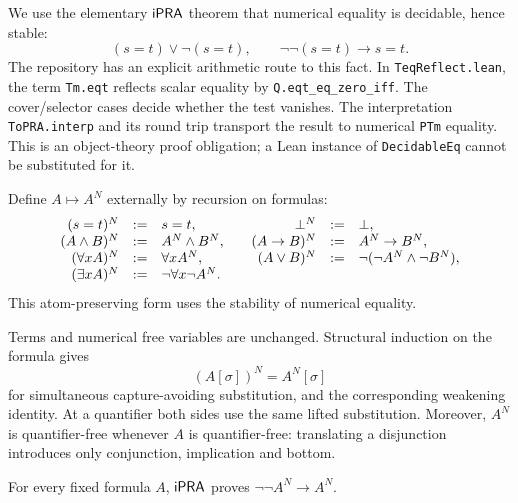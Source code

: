 We use the elementary \(\mathsf{iPRA}\) theorem that numerical equality is
decidable, hence stable:
\[
 (s=t)\lor\neg(s=t),
 \qquad \neg\neg(s=t)\longrightarrow s=t.
\]
The repository has an explicit arithmetic route to this fact. In
\texttt{TeqReflect.lean}, the term \texttt{Tm.eqt} reflects scalar equality
by \texttt{Q.eqt\_eq\_zero\_iff}. The cover/selector cases decide whether
the test vanishes. The interpretation \texttt{ToPRA.interp} and its round
trip transport the result to numerical \texttt{PTm} equality. This is an
object-theory proof obligation; a Lean instance of \texttt{DecidableEq}
cannot be substituted for it.

\begin{definition}
\label{def:negative}
Define \(A\mapsto A^N\) externally by recursion on formulas:
\[
\begin{array}{rcl@{\qquad}rcl}
 (s=t)^N&:=&s=t,& \bot^N&:=&\bot,\\
 (A\land B)^N&:=&A^N\land B^N,
   &(A\to B)^N&:=&A^N\to B^N,\\
 (\forall x A)^N&:=&\forall x A^N,
   &(A\lor B)^N&:=&\neg(\neg A^N\land\neg B^N),\\
 (\exists x A)^N&:=&\neg\forall x\neg A^N.&&&
\end{array}
\]
This atom-preserving form uses the stability of numerical equality.
\end{definition}

Terms and numerical free variables are unchanged. Structural induction on
the formula gives
\[
 (A[\sigma])^N=A^N[\sigma]
\]
for simultaneous capture-avoiding substitution, and the corresponding
weakening identity. At a quantifier both sides use the same lifted
substitution. Moreover, \(A^N\) is quantifier-free whenever \(A\) is
quantifier-free: translating a disjunction introduces only conjunction,
implication and bottom.

\begin{lemma}
\label{lem:negative-stable}
For every fixed formula \(A\), \(\mathsf{iPRA}\) proves
\(\neg\neg A^N\to A^N\).
\end{lemma}

